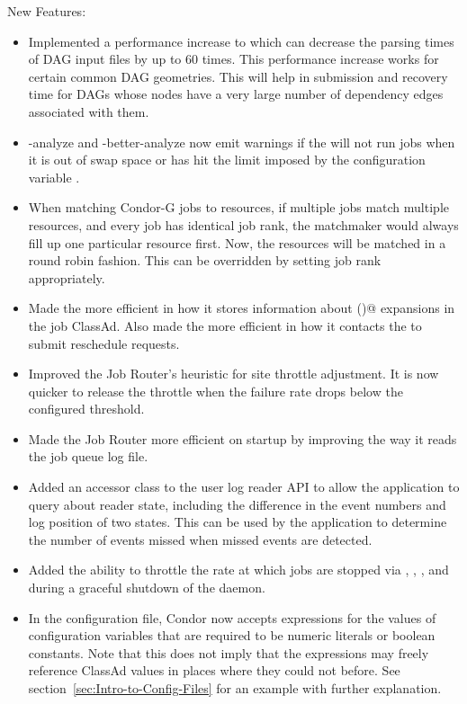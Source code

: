 \noindent New Features:

\begin{itemize}

\item Implemented a performance increase to  which can
decrease the parsing times of DAG input files by up to 60 times.
This performance increase works for certain common DAG geometries.
This will help in submission and recovery
time for DAGs whose nodes have a very large number of dependency edges
associated with them.

\item {} -analyze and -better-analyze now emit warnings
if the  will not run jobs when it is out of swap space or
has hit the limit imposed by the configuration variable
.

\item When matching Condor-G jobs to resources, if multiple jobs
match multiple resources, and every job has identical job rank, the
matchmaker would always fill up one particular resource first.  Now,
the resources will be matched in a round robin fashion.  This can be
overridden by setting job rank appropriately.

\item Made the  more efficient in how it stores
information about \verb@$$()@ expansions in the job ClassAd.
Also made the  more efficient in how it contacts
the  to submit reschedule requests.

\item Improved the Job Router's heuristic for site throttle adjustment.  It
is now quicker to release the throttle when the failure rate drops
below the configured threshold.

\item Made the Job Router more efficient on startup by improving the way it
reads the job queue log file.

\item Added an accessor class to the user log reader API to allow the
  application to query about reader state, including the
  difference in the event numbers and log position of two states.  This
  can be used by the application to determine the number of events
  missed when missed events are detected.

\item Added the ability to throttle the rate at which jobs are
stopped via , , ,
and during a graceful shutdown of the  daemon.

\item In the configuration file, Condor now accepts expressions for
the values of configuration variables that are required to be 
numeric literals or boolean constants.  
Note that this does not imply that the
expressions may freely reference ClassAd values in places where they
could not before.  
See section~\ref{sec:Intro-to-Config-Files} for an example with
further explanation.

\end{itemize}

